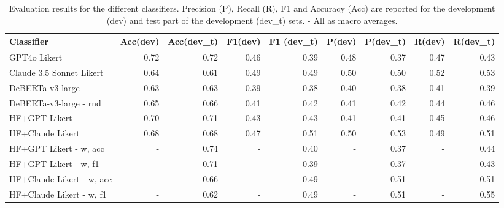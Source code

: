 \begin{table*}
    \centering
    \begin{tabular}{lrrrrrrrr}
        \toprule
        Classifier & Acc(dev) & Acc(dev\_t) & F1(dev) & F1 (dev\_t) & P(dev) & P(dev\_t) & R(dev) & R(dev\_t) \\
        \midrule
        GPT4o Likert & 0.72 & 0.72 & 0.46 & 0.39 & 0.48 & 0.37 & 0.47 & 0.43 \\
        Claude 3.5 Sonnet Likert & 0.64 & 0.61 & 0.49 & 0.49 & 0.50 & 0.50 & 0.52 & 0.53 \\
        DeBERTa-v3-large & 0.63 & 0.63 & 0.39 & 0.38 & 0.40 & 0.38 & 0.41 & 0.39 \\
        DeBERTa-v3-large - rnd & 0.65 & 0.66 & 0.41 & 0.42 & 0.41 & 0.42 & 0.44 & 0.46 \\
        HF+GPT Likert & 0.70 & 0.71 & 0.43 & 0.43 & 0.41 & 0.41 & 0.45 & 0.46 \\
        HF+Claude Likert & 0.68 & 0.68 & 0.47 & 0.51 & 0.50 & 0.53 & 0.49 & 0.51 \\
        HF+GPT Likert - w, acc & - & 0.74 & - & 0.40 & - & 0.37 & - & 0.44 \\
        HF+GPT Likert - w, f1 & - & 0.71 & - & 0.39 & - & 0.37 & - & 0.43 \\
        HF+Claude Likert - w, acc & - & 0.66 & - & 0.49 & - & 0.51 & - & 0.51 \\
        HF+Claude Likert - w, f1 & - & 0.62 & - & 0.49 & - & 0.51 & - & 0.55 \\
        \bottomrule
        \end{tabular}

        \caption{Evaluation results for the different classifiers. Precision (P), Recall (R), F1 and Accuracy (Acc) are reported for the development (dev) and test part of the development (dev\_t) sets. - All as macro averages.}
\end{table*}